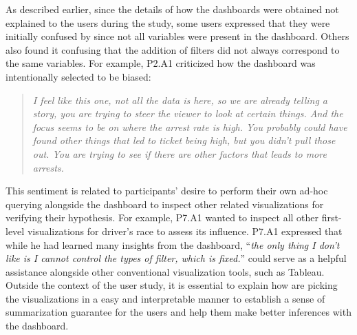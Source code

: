 \par As described earlier, since the details of how the dashboards were obtained  not explained to the users during the study, some users expressed that they were initially confused by \system since not all variables were present in the dashboard. Others also found it confusing that the addition of filters did not always correspond to the same variables. For example, P2.A1 criticized how the dashboard was intentionally selected to be biased:
\begin{quote}
\textit{I feel like this one, not all the data is here, so we are already telling a story, you are trying to steer the viewer to look at certain things. And the focus seems to be on where the arrest rate is high. You probably could have found other things that led to ticket being high, but you didn't pull those out. You are trying to see if there are other factors that leads to more arrests.}
\end{quote}
\npar This sentiment is related to participants' desire to perform their own ad-hoc querying alongside the dashboard to inspect other related visualizations for verifying their hypothesis. For example, P7.A1 wanted to inspect all other first-level visualizations for driver's race to assess its influence. P7.A1 expressed that while he had learned many insights from the dashboard, ``\textit{the only thing I don't like is I cannot control the types of filter, which is fixed.}''  \system could serve as a helpful assistance alongside other conventional visualization tools, such as Tableau. Outside the context of the user study, it is essential to explain how \system are picking the visualizations in a easy and interpretable manner to establish a sense of summarization guarantee for the users and help them make better inferences with the dashboard.

